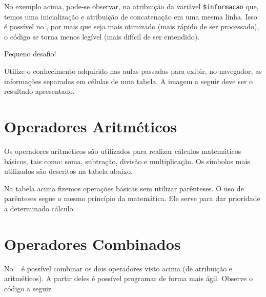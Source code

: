

No exemplo acima, pode-se observar, na atribuição da variável \texttt{\$informacao} que, 
temos uma inicialização e atribuição de concatenação em uma mesma linha. Isso é possível
no \php, por mais que seja mais otimizado (mais rápido de ser processado), o código se
torna menos legível (mais difícil de ser entendido).

{\Large Pequeno desafio!}

Utilize o conhecimento adquirido nas aulas passadas para exibir, no navegador, as informações
separadas em células de uma tabela. A imagem a seguir deve ser o resultado apresentado. 


\section{Operadores Aritméticos}
\label{operadores-aritmeticos}

Os operadores aritméticos são utilizados para realizar cálculos matemáticos básicos, tais
como: soma, subtração, divisão e multiplicação. Os símbolos mais utilizados são descritos
na tabela abaixo.



Na tabela acima fizemos operações básicas sem utilizar parênteses. O uso de parênteses
segue o mesmo princípio da matemática. Ele serve para dar prioridade a determinado
cálculo.

\section{Operadores Combinados}
\label{operadores-combinados}

No \php~ é possível combinar os dois operadores visto acima (de atribuição e aritméticos).
A partir deles é possível programar de forma mais ágil. Observe o código a seguir.

\begin{multicols}{2}

  
  \columnbreak

  

\end{multicols}


